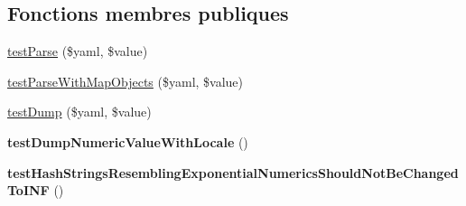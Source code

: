 \subsection*{Fonctions membres publiques}
\begin{DoxyCompactItemize}
\item 
\hyperlink{class_symfony_1_1_component_1_1_yaml_1_1_tests_1_1_inline_test_a57670a694638f4f3545c2f2ada095921}{test\+Parse} (\$yaml, \$value)
\item 
\hyperlink{class_symfony_1_1_component_1_1_yaml_1_1_tests_1_1_inline_test_aac94761e9a4a6f3f5432a543825f4772}{test\+Parse\+With\+Map\+Objects} (\$yaml, \$value)
\item 
\hyperlink{class_symfony_1_1_component_1_1_yaml_1_1_tests_1_1_inline_test_ad33876b5f1526bdede1a2301d8c2c8ba}{test\+Dump} (\$yaml, \$value)
\item 
{\bfseries test\+Dump\+Numeric\+Value\+With\+Locale} ()\hypertarget{class_symfony_1_1_component_1_1_yaml_1_1_tests_1_1_inline_test_a96cb5dde19e80674e44f6d976dc8b3db}{}\label{class_symfony_1_1_component_1_1_yaml_1_1_tests_1_1_inline_test_a96cb5dde19e80674e44f6d976dc8b3db}

\item 
{\bfseries test\+Hash\+Strings\+Resembling\+Exponential\+Numerics\+Should\+Not\+Be\+Changed\+To\+I\+NF} ()\hypertarget{class_symfony_1_1_component_1_1_yaml_1_1_tests_1_1_inline_test_add0340153c5cb0257b52b38141216a2b}{}\label{class_symfony_1_1_component_1_1_yaml_1_1_tests_1_1_inline_test_add0340153c5cb0257b52b38141216a2b}


\end{DoxyCompactItemize}
